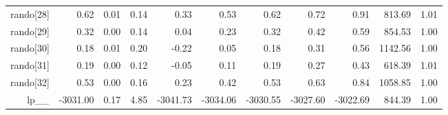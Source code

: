 \begin{table}[ht]
\begin{tabular}{rrrrrrrrrrr}
  rando[28] & 0.62 & 0.01 & 0.14 & 0.33 & 0.53 & 0.62 & 0.72 & 0.91 & 813.69 & 1.01 \\ 
  rando[29] & 0.32 & 0.00 & 0.14 & 0.04 & 0.23 & 0.32 & 0.42 & 0.59 & 854.53 & 1.00 \\ 
  rando[30] & 0.18 & 0.01 & 0.20 & -0.22 & 0.05 & 0.18 & 0.31 & 0.56 & 1142.56 & 1.00 \\ 
  rando[31] & 0.19 & 0.00 & 0.12 & -0.05 & 0.11 & 0.19 & 0.27 & 0.43 & 618.39 & 1.01 \\ 
  rando[32] & 0.53 & 0.00 & 0.16 & 0.23 & 0.42 & 0.53 & 0.63 & 0.84 & 1058.85 & 1.00 \\ 
  lp\_\_ & -3031.00 & 0.17 & 4.85 & -3041.73 & -3034.06 & -3030.55 & -3027.60 & -3022.69 & 844.39 & 1.00 \\ 
   \hline
\end{tabular}
\label{weifit_tab}
\end{table}
